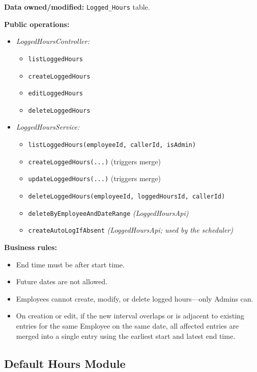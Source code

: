 \documentclass[11pt,a4paper]{article}
\begin{document}
\textbf{Data owned/modified:} \texttt{Logged\_Hours} table.

\textbf{Public operations:}
\begin{itemize}[leftmargin=1.5em]
    \item \textit{LoggedHoursController:}
    \begin{itemize}[noitemsep, leftmargin=1.5em]
        \item \texttt{listLoggedHours}
        \item \texttt{createLoggedHours}
        \item \texttt{editLoggedHours}
        \item \texttt{deleteLoggedHours}
    \end{itemize}
    \item \textit{LoggedHoursService:}
    \begin{itemize}[noitemsep, leftmargin=1.5em]
        \item \texttt{listLoggedHours(employeeId, callerId, isAdmin)}
        \item \texttt{createLoggedHours(...)} (triggers merge)
        \item \texttt{updateLoggedHours(...)} (triggers merge)
        \item \texttt{deleteLoggedHours(employeeId, loggedHoursId, callerId)}
        \item \texttt{deleteByEmployeeAndDateRange} \textit{(LoggedHoursApi)}
        \item \texttt{createAutoLogIfAbsent} \textit{(LoggedHoursApi; used by the scheduler)}
    \end{itemize}
\end{itemize}

\textbf{Business rules:}
\begin{itemize}[leftmargin=1.5em]
    \item End time must be after start time.
    \item Future dates are not allowed.
    \item Employees cannot create, modify, or delete logged hours---only Admins can.
    \item On creation or edit, if the new interval overlaps or is adjacent to existing entries for the same Employee on the same date, all affected entries are merged into a single entry using the earliest start and latest end time.
\end{itemize}

\subsection{Default Hours Module}
\end{document}
